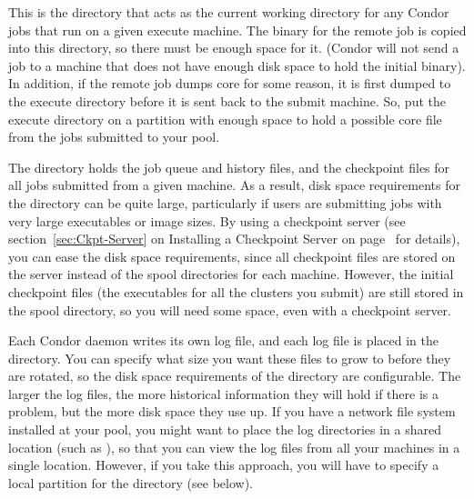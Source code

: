 \begin{description}
\item[\File{execute}] This is the directory that acts as the current working
directory for any Condor jobs that run on a given execute machine.
The binary for the remote job is copied into this directory, so
there
must be enough space for it.  (Condor will not send a job to a
machine that does not have enough disk space to hold the initial
binary).  In addition, if the remote job dumps core for some reason,
it is first dumped to the execute directory before it is sent back to
the submit machine.  So, put the execute directory on
a partition with enough space to hold a possible core file from the
jobs submitted to your pool.

\item[\File{spool}] The  directory holds the job queue
and history files,
and the checkpoint files for all jobs submitted from a given machine.
As a result, disk space requirements for the  directory
can be quite large,
particularly if users are submitting jobs with very large
executables or image sizes.
By using a checkpoint server
(see section~\ref{sec:Ckpt-Server} on Installing a Checkpoint Server on
page~\pageref{sec:Ckpt-Server} for details),
you can ease the disk
space requirements, since all checkpoint files are stored on the
server instead of the spool directories for each machine.  However,
the initial checkpoint files (the executables for all the clusters you
submit) are still stored in the spool directory, so you will need
%
%
some space, even with a checkpoint server.

\item[\File{log}] Each Condor daemon writes its own log file,
and each log file is placed
in the  directory.  You can specify what size you want these files
to grow to before they are rotated,
%
%
so the disk space requirements of
the directory are configurable.
The larger the log files, the more
historical information they will hold if there is a problem, but the
more disk space they use up.  If you have a network file system
installed at your pool, you might want to place the log directories in
a shared location (such as ),
so that you can view the log files from all your machines in a single
location.  However, if you take this approach, you will have to
specify a local partition for the  directory (see below).


\end{description}
